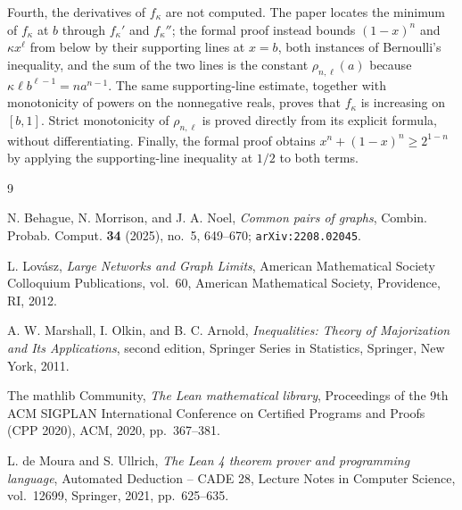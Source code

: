 \documentclass[11pt]{article}
\theoremstyle{definition}
\theoremstyle{remark}
\begin{document}
Fourth, the derivatives of $f_\kappa$ are not computed.  The paper
locates the minimum of $f_\kappa$ at $b$ through $f_\kappa'$ and
$f_\kappa''$; the formal proof instead bounds $(1-x)^n$ and
$\kappa x^\ell$ from below by their supporting lines at $x=b$, both
instances of Bernoulli's inequality, and the sum of the two lines is
the constant $\rho_{n,\ell}(a)$ because
$\kappa\ell b^{\ell-1}=na^{n-1}$.  The same supporting-line estimate,
together with monotonicity of powers on the nonnegative reals, proves
that $f_\kappa$ is increasing on $[b,1]$.  Strict monotonicity of
$\rho_{n,\ell}$ is proved directly from its explicit formula, without
differentiating.  Finally, the formal proof obtains
$x^n+(1-x)^n\ge 2^{1-n}$ by applying the supporting-line inequality
at $1/2$ to both terms.
\begin{thebibliography}{9}

N. Behague, N. Morrison, and J. A. Noel,
\emph{Common pairs of graphs},
Combin. Probab. Comput. \textbf{34} (2025), no.~5, 649--670;
\texttt{arXiv:2208.02045}.

L. Lov\'asz,
\emph{Large Networks and Graph Limits},
American Mathematical Society Colloquium Publications, vol.~60,
American Mathematical Society, Providence, RI, 2012.

A. W. Marshall, I. Olkin, and B. C. Arnold,
\emph{Inequalities: Theory of Majorization and Its Applications},
second edition, Springer Series in Statistics,
Springer, New York, 2011.

The mathlib Community,
\emph{The Lean mathematical library},
Proceedings of the 9th ACM SIGPLAN International Conference on
Certified Programs and Proofs (CPP 2020), ACM, 2020, pp.~367--381.

L. de Moura and S. Ullrich,
\emph{The Lean 4 theorem prover and programming language},
Automated Deduction -- CADE 28, Lecture Notes in Computer Science,
vol.~12699, Springer, 2021, pp.~625--635.

\end{thebibliography}
\end{document}
